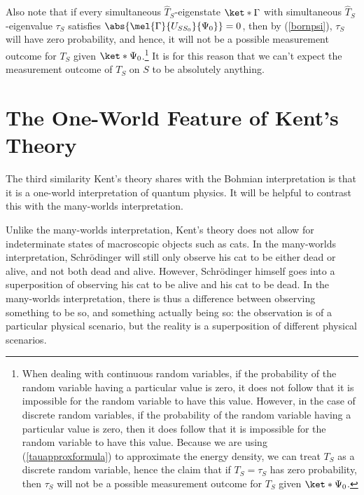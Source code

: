 \documentclass[12pt]{report}
\begin{document}
  Also note that  if every simultaneous $\hat{T}_S$-eigenstate $\ket*{\Gamma}$ with simultaneous $\hat{T}_S$-eigenvalue $\tau_S$ satisfies $\abs{\mel{\Gamma}{U_{SS_0}}{\Psi_0}}=0$, then by (\ref{bornpsi}), $\tau_S$ will have zero probability, and hence, it will not be a possible measurement outcome for $T_S$ given $\ket*{\Psi_0}$.\footnote{\label{discreteRV}When dealing with continuous random variables, if the probability of the random variable having a particular value is  zero, it does not follow that it is impossible for the random variable to have this value. However, in the case of discrete random variables,  if the probability of the random variable having a particular value is  zero, then it does  follow that it is impossible for the random variable to have this value. Because we are using (\ref{tauapproxformula}) to approximate the energy density, we can treat  $T_S$ as a discrete random variable, hence the claim that if $T_S=\tau_S$ has zero probability,  then $\tau_S$ will not be a possible measurement outcome for $T_S$ given $\ket*{\Psi_0}$.} It is for this reason that we can't expect the measurement outcome of $T_S$ on $S$ to be absolutely anything.










 








 

\section{The One-World Feature of Kent's Theory\label{OneWorldFeature}}
The third similarity Kent's theory shares with the Bohmian interpretation is that it is a one-world interpretation of quantum physics. It will be helpful to contrast this with the many-worlds interpretation. 

 Unlike the many-worlds interpretation, Kent's theory does not allow for indeterminate states of macroscopic objects such as cats. In the many-worlds interpretation, Schr\"{o}dinger will still only observe his cat to be either dead or alive, and not both dead and alive. However, Schr\"{o}dinger himself goes into a superposition of observing his cat to be alive and his cat to be dead. In the many-worlds interpretation, there is thus a difference between observing something to be so, and something actually being so: the observation is of a particular physical scenario, but the reality is a superposition of different physical scenarios. 
\end{document}
